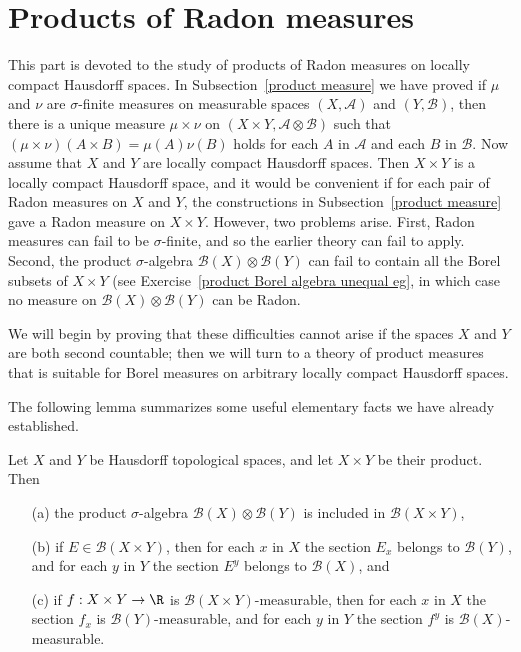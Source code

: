 \section{Products of Radon measures}\label{Radon product}
This part is devoted to the study of products of Radon measures on locally compact Hausdorff spaces. In Subsection~\ref{product measure} we have proved if $\mu$ and $\nu$ are $\sigma$-finite measures on measurable spaces $(X,\mathcal{A})$ and $(Y,\mathcal{B})$, then there is a unique measure $\mu\times\nu$ on $(X\times Y,\mathcal{A}\otimes\mathcal{B})$ such that $(\mu\times\nu)(A\times B)=\mu(A)\nu(B)$ holds for each $A$ in $\mathcal{A}$ and each $B$ in $\mathcal{B}$. Now assume that $X$ and $Y$ are locally compact Hausdorff spaces. Then $X\times Y$ is a locally compact Hausdorff space, and it would be convenient if for each pair of Radon measures on $X$ and $Y$, the constructions in Subsection~\ref{product measure} gave a Radon measure on $X\times Y$. However, two problems arise. First, Radon measures can fail to be $\sigma$-finite, and so the earlier theory can fail to apply. Second, the product $\sigma$-algebra $\mathcal{B}(X)\otimes\mathcal{B}(Y)$ can fail to contain all the Borel subsets of $X\times Y$ (see Exercise~\ref{product Borel algebra unequal eg}, in which case no measure on $\mathcal{B}(X)\otimes\mathcal{B}(Y)$ can be Radon.\par
We will begin by proving that these difficulties cannot arise if the spaces $X$ and $Y$ are both second countable; then we will turn to a theory of product measures that is suitable for Borel measures on arbitrary locally compact Hausdorff spaces.\par
The following lemma summarizes some useful elementary facts we have already established.
\begin{lemma}\label{section of Borel sets}
Let $X$ and $Y$ be Hausdorff topological spaces, and let $X\times Y$ be their product. Then
\begin{itemize}
\item[(a)] the product $\sigma$-algebra $\mathcal{B}(X)\otimes\mathcal{B}(Y)$ is included in $\mathcal{B}(X\times Y)$,
\item[(b)] if $E\in\mathcal{B}(X\times Y)$, then for each $x$ in $X$ the section $E_x$ belongs to $\mathcal{B}(Y)$, and for each $y$ in $Y$ the section $E^y$ belongs to $\mathcal{B}(X)$, and
\item[(c)] if $f:X\times Y\to\R$ is $\mathcal{B}(X\times Y)$-measurable, then for each $x$ in $X$ the section $f_x$ is $\mathcal{B}(Y)$-measurable, and for each $y$ in $Y$ the section $f^y$ is $\mathcal{B}(X)$-measurable.
\end{itemize}
\end{lemma}
